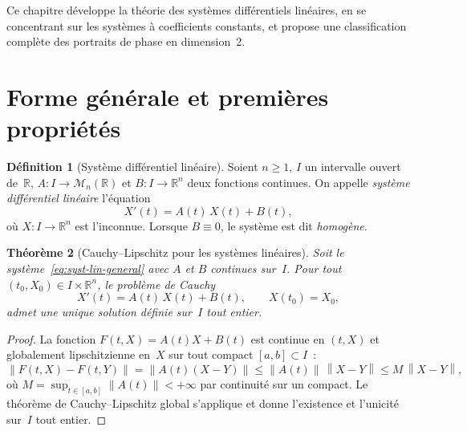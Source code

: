 \documentclass[12pt,a4paper,openany]{book}
\theoremstyle{definition}
\newtheorem{definition}{Définition}[chapter]
\theoremstyle{plain}
\newtheorem{theoreme}[definition]{Théorème}
\theoremstyle{remark}
\newcommand{\R}{\mathbb{R}}
\newcommand{\norm}[1]{\left\|#1\right\|}
\begin{document}
\medskip

Ce chapitre développe la théorie des systèmes différentiels linéaires,
en se concentrant sur les systèmes à coefficients constants, et propose
une classification complète des portraits de phase en dimension~2.

\section{Forme générale et premières propriétés}\label{sec:syst-forme-generale}

\begin{definition}[Système différentiel linéaire]\label{def:syst-diff-lin}
  Soient $n \geq 1$, $I$ un intervalle ouvert de~$\R$,
  $A \colon I \to \mathcal{M}_n(\R)$ et
  $B \colon I \to \R^n$ deux fonctions continues.
  On appelle \emph{système différentiel linéaire} l'équation
  \begin{equation}\label{eq:syst-lin-general}
    X'(t) = A(t)\,X(t) + B(t),
  \end{equation}
  où $X \colon I \to \R^n$ est l'inconnue. Lorsque $B \equiv 0$,
  le système est dit \emph{homogène}.
\end{definition}

\begin{theoreme}[Cauchy--Lipschitz pour les systèmes linéaires]\label{thm:CL-systemes}
  Soit le système~\eqref{eq:syst-lin-general} avec $A$ et $B$
  continues sur~$I$. Pour tout $(t_0, X_0) \in I \times \R^n$,
  le problème de Cauchy
  \[
    X'(t) = A(t)\,X(t) + B(t), \qquad X(t_0) = X_0,
  \]
  admet une \emph{unique} solution définie sur~$I$ tout entier.
\end{theoreme}

\begin{proof}
  La fonction $F(t,X) = A(t)X + B(t)$ est continue en $(t,X)$ et
  globalement lipschitzienne en~$X$ sur tout compact $[a,b] \subset I$~:
  \[
    \norm{F(t,X) - F(t,Y)} = \norm{A(t)(X-Y)}
      \leq \norm{A(t)}\,\norm{X-Y}
      \leq M\,\norm{X-Y},
  \]
  où $M = \sup_{t \in [a,b]} \norm{A(t)} < +\infty$ par continuité
  sur un compact. Le théorème de Cauchy--Lipschitz global
  s'applique et donne l'existence et l'unicité sur~$I$ tout entier.
\end{proof}
\end{document}
